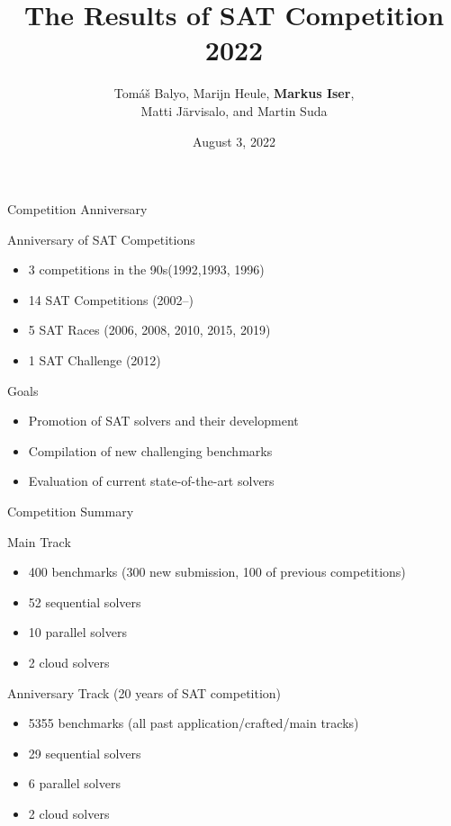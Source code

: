 \documentclass{beamer}
\title[SAT Competition 2022]{The Results of SAT Competition 2022}
\author[Balyo, Heule, Iser, J\"{a}rvisalo, Suda] {Tom{\'a}{\v s} Balyo, Marijn Heule,
{\bf Markus Iser},\\ Matti J\"{a}rvisalo, and Martin Suda}
\institute[] %
{
SAT 2022 Conference, Haifa (Israel) \\ %
}
\date{August 3, 2022} %
\begin{document}
\begin{frame}
\titlepage %
\end{frame}

\begin{frame}{Competition Anniversary}

\begin{block}{Anniversary of SAT Competitions}
\begin{itemize}
\item 3 competitions in the 90s\hfill (1992,1993, 1996)
\item 14 SAT Competitions \hfill (2002--)
\item 5 SAT Races \hfill (2006, 2008, 2010, 2015, 2019)
\item 1 SAT Challenge \hfill (2012)
\end{itemize}
\end{block}

\bigskip

\begin{block}{Goals}
\begin{itemize}
\item Promotion of SAT solvers and their development
\item Compilation of new challenging benchmarks
\item Evaluation of current state-of-the-art solvers
\end{itemize}
\end{block}

\end{frame}


\begin{frame}{Competition Summary}
\begin{block}{Main Track}
\begin{itemize}
  \item 400 benchmarks (300 new submission, 100 of previous competitions)
  \item 52 sequential solvers
  \item 10 parallel solvers
  \item 2 cloud solvers
\end{itemize}
\end{block}

\begin{block}{Anniversary Track (20 years of SAT competition)}
\begin{itemize}
  \item 5355 benchmarks (all past application/crafted/main tracks)
  \item 29 sequential solvers
  \item 6 parallel solvers
  \item 2 cloud solvers
\end{itemize}
\end{block}
\end{frame}
\end{document}
